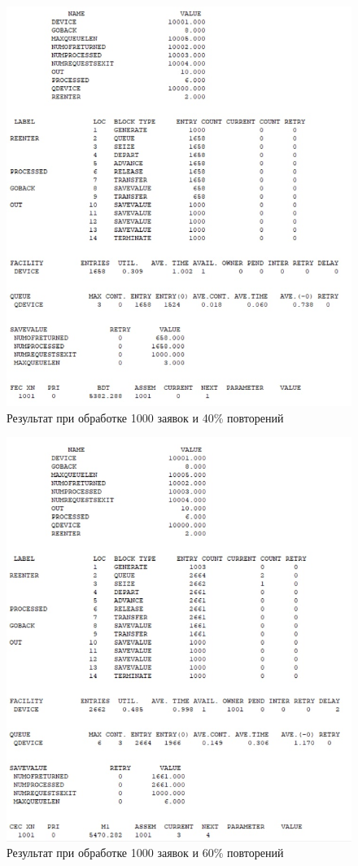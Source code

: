 \begin{figure}[H]
	\centering
	\includegraphics[width=\textwidth]{assets/40.jpg}
	\caption{Результат при обработке 1000 заявок и 40\% повторений}
	\label{fig:r40}
\end{figure}


\begin{figure}[H]
	\centering
	\includegraphics[width=\textwidth]{assets/60.jpg}
	\caption{Результат при обработке 1000 заявок и 60\% повторений}
	\label{fig:r60}
\end{figure}

